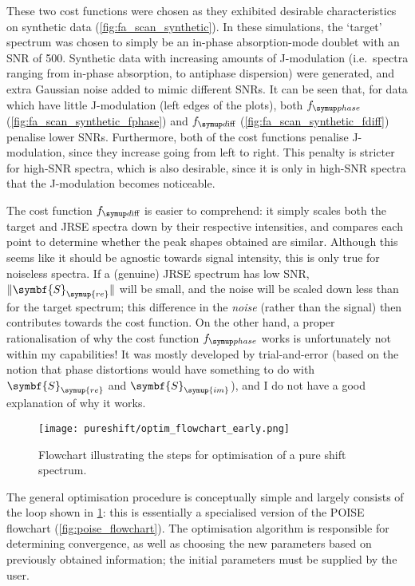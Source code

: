 These two cost functions were chosen as they exhibited desirable characteristics on synthetic data (\cref{fig:fa_scan_synthetic}).
In these simulations, the `target' spectrum was chosen to simply be an in-phase absorption-mode doublet with an SNR of 500.
Synthetic data with increasing amounts of J-modulation (i.e.\ spectra ranging from in-phase absorption, to antiphase dispersion) were generated, and extra Gaussian noise added to mimic different SNRs.
It can be seen that, for data which have little J-modulation (left edges of the plots), both $\fphase$ (\cref{fig:fa_scan_synthetic_fphase}) and $\fdiff$ (\cref{fig:fa_scan_synthetic_fdiff}) penalise lower SNRs.
Furthermore, both of the cost functions penalise J-modulation, since they increase going from left to right.
This penalty is stricter for high-SNR spectra, which is also desirable, since it is only in high-SNR spectra that the J-modulation becomes noticeable.

The cost function $\fdiff$ is easier to comprehend: it simply scales both the target and JRSE spectra down by their respective intensities, and compares each point to determine whether the peak shapes obtained are similar.
Although this seems like it should be agnostic towards signal intensity, this is only true for noiseless spectra.
If a (genuine) JRSE spectrum has low SNR, $\lVert \symbf{S}_{\symup{re}} \rVert$ will be small, and the noise will be scaled down less than for the target spectrum; this difference in the \textit{noise} (rather than the signal) then contributes towards the cost function.
On the other hand, a proper rationalisation of why the cost function $\fphase$ works is unfortunately not within my capabilities!
It was mostly developed by trial-and-error (based on the notion that phase distortions would have something to do with $\symbf{S}_{\symup{re}}$ and $\symbf{S}_{\symup{im}}$), and I do not have a good explanation of why it works.

\begin{figure}[htbp]
    \centering
    \texttt{[image: pureshift/optim\_flowchart\_early.png]}%
    \caption[Flowchart for pure shift optimisation process]{
        Flowchart illustrating the steps for optimisation of a pure shift spectrum.
    }
    \label{fig:optim_flowchart_early}
\end{figure}

The general optimisation procedure is conceptually simple and largely consists of the loop shown in \cref{fig:optim_flowchart_early}: this is essentially a specialised version of the POISE flowchart (\cref{fig:poise_flowchart}).
The optimisation algorithm is responsible for determining convergence, as well as choosing the new parameters based on previously obtained information; the initial parameters must be supplied by the user.

